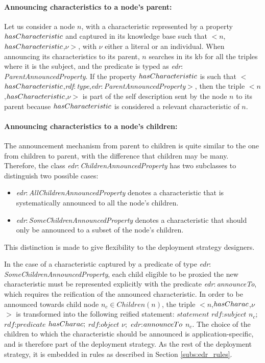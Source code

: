 \documentclass[sw]{iosart2x}
\newcommand{\namespace}[1]{\textit{#1$:$}}
\newcommand{\concept}[2]{\namespace{#1}\-\textit{#2}}
\newcommand{\triplet}[3]{$<$#1,\textit{#2},#3$>$}
\begin{document}
\paragraph{Announcing characteristics to a node's parent:}
Let us consider a node $n$, with a characteristic represented by a property $has\-Charac\-teris\-tic$ and captured in its knowledge base such that \triplet{$n$}{$has\-Charac\-teris\-tic$}{$\nu$}, with $\nu$ either a literal or an individual.
When announcing its characteristics to its parent, $n$ searches in its \gls{kb} for all the triples where it is the subject, and the predicate is typed as \concept{edr}{Parent\-Announced\-Property}.
If the property $has\-Charac\-teris\-tic$ is such that \triplet{$has\-Charac\-teris\-tic$}{\concept{rdf}{type}}{\concept{edr}{Parent\-Announced\-Property}}, then the triple \triplet{$n$}{$has\-Charac\-teris\-tic$}{$\nu$} is part of the self description sent by the node $n$ to its parent because $has\-Charac\-teris\-tic$ is considered a relevant characteristic of $n$.

\paragraph{Announcing characteristics to a node's children:}
The announcement mechanism from parent to children is quite similar to the one from children to parent, with the difference that children may be many.
Therefore, the class \concept{edr}{Children\-Announced\-Property} has two subclasses to distinguish two possible cases:
\begin{itemize}
	\item \concept{edr}{All\-Children\-Announced\-Property} denotes a characteristic that is systematically announced to all the node's children.
	\item \concept{edr}{Some\-Children\-Announced\-Property} denotes a characteristic that should only be announced to a subset of the node's children. 
\end{itemize}
This distinction is made to give flexibility to the deployment strategy designers.

In the case of a characteristic captured by a predicate of type \concept{edr}{Some\-Children\-Announced\-Property}, each child eligible to be proxied the new characteristic must be represented explicitly with the predicate \concept{edr}{announce\-To}, which requires the reification of the announced characteristic.
In order to be announced towards child node $n_{c}\in Children(n)$, the triple \triplet{$n$}{$has\-Charac$}{$\nu$} is transformed into the following reified statement: 
$statement$ $rdf$:$subject$ $n_{c};$ $rdf$:$predicate$ $has\-Charac;$ $rdf$:$object$ $\nu;$ $edr$:$an\-nounce\-To$ $n_{c}$. 
The choice of the children to which the characteristic should be announced is application-specific, and is therefore part of the deployment strategy.
As the rest of the deployment strategy, it is embedded in rules as described in Section \textsection \ref{subs:edr_rules}.
\end{document}
